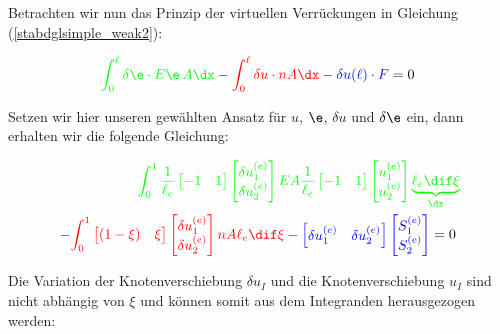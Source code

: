 Betrachten wir nun das Prinzip der virtuellen Verrückungen in Gleichung (\ref{stabdglsimple_weak2}):

\begin{align}
 \textcolor{green}{\int_{0}^{\ell} \delta \e \cdot E\e \, A \dx} -\textcolor{red} {\int_0^{\ell} \delta u \cdot n A \dx} - \textcolor{blue}{\delta u(\ell) \cdot F} = 0\; 
 \end{align}

Setzen wir hier unseren gewählten Ansatz für $u$, $\e$, $\delta u$ und $\delta \e$ ein, dann erhalten wir die folgende Gleichung:

\begin{align}
 \textcolor{green}{\int_{0}^{1} \frac{1}{\ell_e} \begin{bmatrix} -1 & 1 \end{bmatrix} \begin{bmatrix} \delta u_1^{(e)} \\ \delta u_2^{(e)}\end{bmatrix}  EA \frac{1}{\ell_e} \begin{bmatrix} -1 & 1 \end{bmatrix} \begin{bmatrix} u_1^{(e)} \\ u_2^{(e)}\end{bmatrix}   \underbrace{\ell_e \dif\xi}_{\dx}} \\
 - \textcolor{red}{\int_0^{1} \begin{bmatrix} (1-\xi) & \xi \end{bmatrix} \begin{bmatrix} \delta u_1^{(e)} \\ \delta u_2^{(e)}\end{bmatrix}  n A \ell_e \dif\xi} - \textcolor{blue}{\begin{bmatrix} \delta u_1^{(e)} & \delta u_2^{(e)}\end{bmatrix} \begin{bmatrix} S_1^{(e)} \\ S_2^{(e)} \end{bmatrix}}  = 0\; 
\end{align}

Die Variation der Knotenverschiebung $\delta u_I$ und die Knotenverschiebung $u_I$ sind nicht abhängig von $\xi$ und können somit aus dem Integranden herausgezogen werden:

